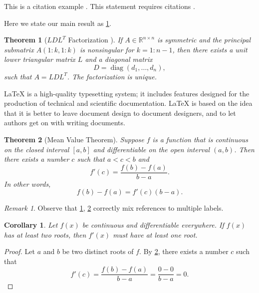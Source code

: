 \documentclass[10pt,reqno,final]{article}
\theoremstyle{plain}
\newtheorem{theorem}{Theorem}[section]
\newtheorem{corollary}{Corollary}[section]
\theoremstyle{definition}
\theoremstyle{remark}
\newtheorem{remark}{Remark}[section]
\numberwithin{equation}{section}
\numberwithin{figure}{section}
\numberwithin{table}{section}
\begin{document}
This is a citation example \cite{Adams2003,TreWei2014}.
This statement requires citations \cite{Shen1994,Tadmor2012,TreWei2014}.

Here we state our main result as \ref{thm:bigthm}.

\begin{theorem}[$LDL^T$ Factorization \cite{GoVa2013}]\label{thm:bigthm}
  If $A \in \mathbb{R}^{n \times n}$ is symmetric and the principal submatrix $A(1:k,1:k)$ is nonsingular for $k=1:n-1$, then there
  exists a unit lower triangular matrix $L$ and a diagonal matrix
  \begin{equation*}
    D = \operatorname{diag}(d_1,\dots,d_n),  %
  \end{equation*}
  such that $A=LDL^T$. The factorization is unique.
\end{theorem}

LaTeX is a high-quality typesetting system; it includes features designed for the production of technical and scientific documentation.
LaTeX is based on the idea that it is better to leave document design to document designers, and to let authors get on with writing documents.

\begin{theorem}[Mean Value Theorem]\label{thm:mvt}
  Suppose $f$ is a function that is continuous on the closed interval $[a,b]$ and differentiable on the open interval $(a,b)$.
  Then there exists a number $c$ such that $a < c < b$ and
  \begin{equation*}
    f'(c) = \frac{f(b)-f(a)}{b-a}.
  \end{equation*}
  In other words,
  \begin{equation*}
    f(b)-f(a) = f'(c)(b-a).
  \end{equation*}
\end{theorem}

\begin{remark}
Observe that \ref{thm:bigthm}, \ref{thm:mvt} correctly mix references to multiple labels.
\end{remark}


\begin{corollary}\label{cor:a}
  Let $f(x)$ be continuous and differentiable everywhere.
  If $f(x)$ has at least two roots, then $f'(x)$ must have at least one root.
\end{corollary}
\begin{proof}
  Let $a$ and $b$ be two distinct roots of $f$.
  By \ref{thm:mvt}, there exists a number $c$ such that
  \begin{equation*}
    f'(c) = \frac{f(b)-f(a)}{b-a} = \frac{0-0}{b-a} = 0.
  \end{equation*}
\end{proof}
\end{document}
